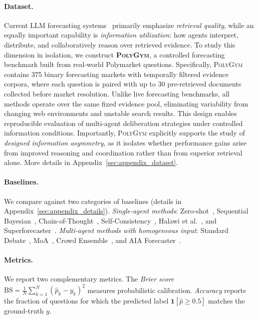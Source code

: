 \documentclass[11pt]{article}
\theoremstyle{plain}
\theoremstyle{definition}
\begin{document}
\paragraph{Dataset.}
Current LLM forecasting systems~\citep{halawi2024approaching,turtel2025llms} primarily emphasize \textit{retrieval quality}, while an equally important capability is \textit{information utilization}: how agents interpret, distribute, and collaboratively reason over retrieved evidence.
To study this dimension in isolation, we construct \textbf{\textsc{PolyGym}}, a controlled forecasting benchmark built from real-world Polymarket questions.
Specifically, \textsc{PolyGym} contains 375 binary forecasting markets with temporally filtered evidence corpora, where each question is paired with up to 30 pre-retrieved documents collected before market resolution.
Unlike live forecasting benchmarks, all methods operate over the same fixed evidence pool, eliminating variability from changing web environments and unstable search results.
This design enables reproducible evaluation of multi-agent deliberation strategies under controlled information conditions.
Importantly, \textsc{PolyGym} explicitly supports the study of \textit{designed information asymmetry}, as it isolates whether performance gains arise from improved reasoning and coordination rather than from superior retrieval alone.
More details in Appendix~\ref{sec:appendix_dataset}.

\paragraph{Baselines.}
We compare against two categories of baselines (details in Appendix~\ref{sec:appendix_details}).
 \textit{Single-agent methods}: Zero-shot~\citep{kojima2022large}, Sequential Bayesian~\citep{shi2023language}, Chain-of-Thought~\citep{wei2022chain}, Self-Consistency~\citep{wangself}, Halawi et al.~\citep{halawi2024approaching}, and Superforecaster~\citep{karger2024forecastbench}.
 \textit{Multi-agent methods with homogeneous input}: Standard Debate~\citep{du2023improving}, MoA~\citep{wangmixture}, Crowd Ensemble~\citep{schoenegger2024wisdom}, and AIA Forecaster~\citep{alur2025aia}.

\paragraph{Metrics.}
We report two complementary metrics.
The \textit{Brier score} $\mathrm{BS} = \frac{1}{N}\sum_{k=1}^{N}(\hat{p}_k - y_k)^2$ measures probabilistic calibration.
\textit{Accuracy} reports the fraction of questions for which the predicted label $\mathbf{1}[\hat{p} \geq 0.5]$ matches the ground-truth $y$.
\end{document}
